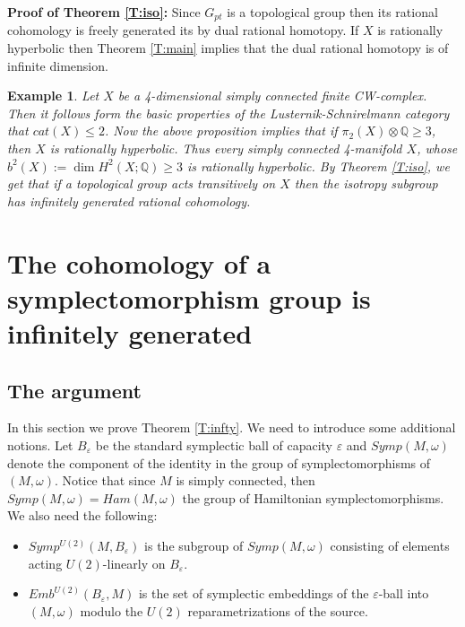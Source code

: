 \documentclass[a4paper,14pt]{article}
\newcommand{\B}[1]{\mathbb #1}
\newcommand{\eps}{{\varepsilon}}
\newcommand{\qed}{\rightline {$\Box $}}
\newcommand{\Mo}{(M,\omega )}
\newcommand{\BS}{{\bigskip}}
\newtheorem{ex}[theorem]{Example}
\numberwithin{equation}{section}
\numberwithin{figure}{section}
\begin{document}
\noindent
{\bf Proof of Theorem \ref{T:iso}:} 
Since $G_{pt}$ is a topological group
then its rational cohomology is freely generated its by dual 
rational homotopy. If $X$ is rationally hyperbolic then
Theorem \ref{T:main} implies that the dual rational
homotopy is of infinite dimension.

\qed

\BS






\begin{ex}\label{E:4dim}
{\em
Let $X$ be a 4-dimensional simply connected finite CW-complex.
Then it follows form the basic properties of the 
Lusternik-Schnirelmann category that $cat(X)\leq 2$. 
Now the above proposition implies
that if $\pi _2(X)\otimes \B Q \geq 3$, then $X$ is
rationally hyperbolic. 
Thus every simply connected 4-manifold $X$, whose 
$b^2(X):=\dim H^2(X;\B Q) \geq 3$ is rationally hyperbolic.
By Theorem \ref{T:iso}, we get that if a topological group
acts  transitively on $X$ then the isotropy subgroup has
infinitely generated rational cohomology.}
\end{ex}




\section {The cohomology of a symplectomorphism group is
infinitely generated}\label{S:infty}


\subsection {The argument}

In this section we prove Theorem \ref{T:infty}. We need to introduce
some additional notions. Let $B_{\eps }$ be the standard symplectic
ball of capacity $\eps $ and $Symp\Mo$ denote the component of
the identity in the group of symplectomorphisms of $\Mo $.
Notice that since $M$ is simply connected, then 
$Symp\Mo = Ham\Mo $ the group of Hamiltonian symplectomorphisms.
We also need the following:


\begin{itemize}


\item $Symp^{U(2)}(M,B_{\eps })$ is the subgroup of $Symp\Mo $
consisting of elements acting $U(2)$-linearly on $B_{\eps}$.

\item $Emb^{U(2)}(B_{\eps},M)$ is the set of symplectic embeddings
of the $\eps$-ball into $\Mo $ modulo the $U(2)$ reparametrizations
of the source.
\end{itemize}
\end{document}
